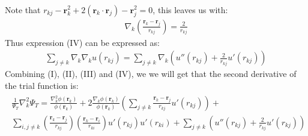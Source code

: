 \documentclass[a4paper, 10pt]{article}
\begin{document}
\begin{appendices}
\begin{align}
		\end{align}
		Note that $r_{kj} - \boldsymbol{r}^2_{k} + 2(\boldsymbol{r}_{k}\cdot \boldsymbol{r}_{j}) - \boldsymbol{r}^2_{j} = 0$, this leaves us with:
		\begin{align}
		\nabla_{k}
		\left(\frac{\boldsymbol{r}_{k} - \boldsymbol{r}_{j}}{r_{kj}}\right)
		= \frac{2}{r_{kj}}
		\end{align}
		Thus expression (IV) can be expressed as:
		\begin{align}
		\sum_{j \neq k}\nabla_{k}\nabla_{k}u(r_{kj}) =
		\sum_{j \neq k}\nabla_{k}\left(u''(r_{kj}) + \frac{2}{r_{kj}}u'(r_{kj})
		\right)
		\end{align}
		Combining (I), (II), (III) and (IV), we we will get that the second derivative
		of the trial function is:
		\begin{align}
		\begin{split}
		\frac{1}{\Psi_{T}}\nabla_{k}^2\Psi_{T} =
		\frac{\nabla_{k}^2\phi{(\boldsymbol{r}_{k})}}{\phi(\boldsymbol{r}_{k})}
		+
		2\frac{\nabla_{k}\phi(\boldsymbol{r}_{k})}{\phi{(\boldsymbol{r}_{k})}}\left(\sum_{j\neq k}\frac{\boldsymbol{r}_{k} - \boldsymbol{r}_{j}}{r_{kj}}u'(r_{kj})\right)
		+\\
		\sum_{i, j\neq k}\left(\frac{\boldsymbol{r}_{k} - \boldsymbol{r}_{j}}{r_{kj}}\right)
		\left(\frac{\boldsymbol{r}_{k} - \boldsymbol{r}_{i}}{r_{ki}}\right)u'(r_{kj})u'(r_{ki})
		+
		\sum_{j \neq k}\left(u''(r_{kj}) + \frac{2}{r_{kj}}u'(r_{kj})\right)
		\end{split}
		\end{align}

\end{appendices}
\end{document}
